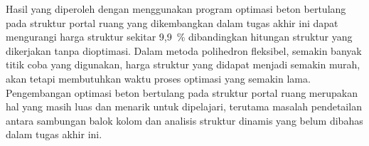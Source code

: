 Hasil yang diperoleh dengan menggunakan program optimasi beton bertulang
pada struktur portal ruang yang dikembangkan dalam tugas akhir ini dapat
mengurangi harga struktur sekitar 9,9~\% dibandingkan hitungan struktur yang
dikerjakan tanpa dioptimasi. Dalam metoda polihedron fleksibel, semakin
banyak titik coba yang digunakan, harga struktur yang didapat menjadi
semakin murah, akan tetapi membutuhkan waktu proses optimasi yang semakin
lama. Pengembangan optimasi beton bertulang pada struktur portal ruang
merupakan hal yang masih luas dan menarik untuk dipelajari, terutama masalah
pendetailan antara sambungan balok kolom dan analisis struktur dinamis yang
belum dibahas dalam tugas akhir ini.

\clearpage
